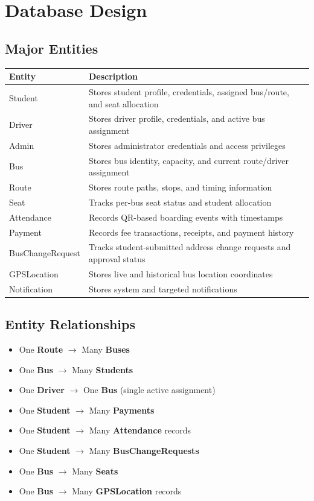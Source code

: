 \documentclass[11pt,a4paper]{report}
\begin{document}
\chapter{Database Design}

\section{Major Entities}
\begin{longtable}{@{}p{3.4cm}p{10.7cm}@{}}
\toprule
\rowcolor{pine!10}\textbf{Entity} & \textbf{Description} \\
\midrule
\endhead
Student & Stores student profile, credentials, assigned bus/route, and seat allocation \\
Driver & Stores driver profile, credentials, and active bus assignment \\
Admin & Stores administrator credentials and access privileges \\
Bus & Stores bus identity, capacity, and current route/driver assignment \\
Route & Stores route paths, stops, and timing information \\
Seat & Tracks per-bus seat status and student allocation \\
Attendance & Records QR-based boarding events with timestamps \\
Payment & Records fee transactions, receipts, and payment history \\
BusChangeRequest & Tracks student-submitted address change requests and approval status \\
GPSLocation & Stores live and historical bus location coordinates \\
Notification & Stores system and targeted notifications \\
\bottomrule
\end{longtable}

\section{Entity Relationships}
\begin{itemize}[leftmargin=1.3em]
  \item One \textbf{Route} \(\rightarrow\) Many \textbf{Buses}
  \item One \textbf{Bus} \(\rightarrow\) Many \textbf{Students}
  \item One \textbf{Driver} \(\rightarrow\) One \textbf{Bus} (single active assignment)
  \item One \textbf{Student} \(\rightarrow\) Many \textbf{Payments}
  \item One \textbf{Student} \(\rightarrow\) Many \textbf{Attendance} records
  \item One \textbf{Student} \(\rightarrow\) Many \textbf{BusChangeRequests}
  \item One \textbf{Bus} \(\rightarrow\) Many \textbf{Seats}
  \item One \textbf{Bus} \(\rightarrow\) Many \textbf{GPSLocation} records
\end{itemize}
\end{document}
